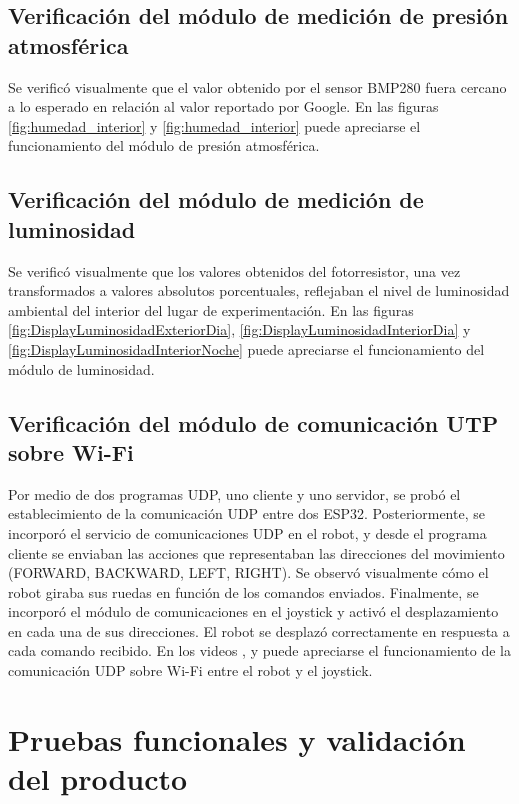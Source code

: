 \subsection{Verificación del módulo de medición de presión atmosférica}
Se verificó visualmente que el valor obtenido por el sensor BMP280 fuera cercano a lo esperado en relación al valor reportado por Google. En las figuras \ref{fig:humedad_interior} y \ref{fig:humedad_interior} puede apreciarse el funcionamiento del módulo de presión atmosférica.


\subsection{Verificación del módulo de medición de luminosidad}
Se verificó visualmente que los valores obtenidos del fotorresistor, una vez transformados a valores absolutos porcentuales, reflejaban el nivel de luminosidad ambiental del interior del lugar de experimentación.
En las figuras \ref{fig:DisplayLuminosidadExteriorDia}, \ref{fig:DisplayLuminosidadInteriorDia} y \ref{fig:DisplayLuminosidadInteriorNoche} puede apreciarse el funcionamiento del módulo de luminosidad.

\subsection{Verificación del módulo de comunicación UTP sobre Wi-Fi}
Por medio de dos programas UDP, uno cliente y uno servidor, se probó el establecimiento de la comunicación UDP entre dos ESP32. Posteriormente, se incorporó el servicio de comunicaciones UDP en el robot, y desde el programa cliente se enviaban las acciones que representaban las direcciones del movimiento (FORWARD, BACKWARD, LEFT, RIGHT). Se observó visualmente cómo el robot giraba sus ruedas en función de los comandos enviados. Finalmente, se incorporó el módulo de comunicaciones en el joystick y activó el desplazamiento en cada una de sus direcciones. El robot se desplazó correctamente en respuesta a cada comando recibido.
En los videos \cite{Demo_ComWifi}, \cite{Prototipado_Comunicacion_JoystickRobot1} y \cite{Prototipado_Comunicacion_JoystickRobot2} puede apreciarse el funcionamiento de la comunicación UDP sobre Wi-Fi entre el robot y el joystick.

\section{Pruebas funcionales y validación del producto}

